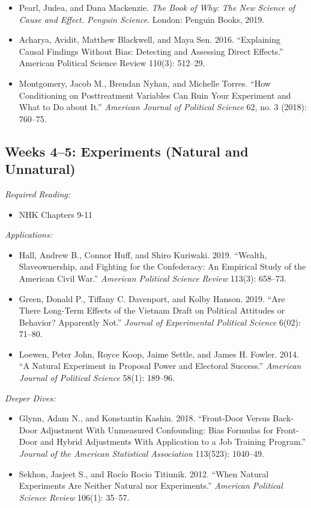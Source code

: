 \documentclass[11pt, letterpaper]{article}
\begin{document}
\begin{itemize}
	\item Pearl, Judea, and Dana Mackenzie. \textit{The Book of Why: The New Science of Cause and Effect. Penguin Science}. London: Penguin Books, 2019.
	\item Acharya, Avidit, Matthew Blackwell, and Maya Sen. 2016. ``Explaining Causal Findings Without Bias: Detecting and Assessing Direct Effects.'' American Political Science Review 110(3): 512–29.
	\item Montgomery, Jacob M., Brendan Nyhan, and Michelle Torres. ``How Conditioning on Posttreatment Variables Can Ruin Your Experiment and What to Do about It.'' \textit{American Journal of Political Science} 62, no. 3 (2018): 760–75.
\end{itemize}

\subsection*{Weeks 4--5: Experiments (Natural and Unnatural)}

\textit{Required Reading:}

\begin{itemize}
	\item NHK Chapters 9-11

\end{itemize}

\noindent \textit{Applications:}

\begin{itemize}
	\item Hall, Andrew B., Connor Huff, and Shiro Kuriwaki. 2019. ``Wealth, Slaveownership, and Fighting for the Confederacy: An Empirical Study of the American Civil War.'' \textit{American Political Science Review} 113(3): 658–73.
	\item Green, Donald P., Tiffany C. Davenport, and Kolby Hanson. 2019. ``Are There Long-Term Effects of the Vietnam Draft on Political Attitudes or Behavior? Apparently Not.'' \textit{Journal of Experimental Political Science} 6(02): 71–80.
	\item Loewen, Peter John, Royce Koop, Jaime Settle, and James H. Fowler. 2014. “A Natural Experiment in Proposal Power and Electoral Success.” \textit{American Journal of Political Science} 58(1): 189–96.
\end{itemize}

\noindent \textit{Deeper Dives:}

\begin{itemize}
	\item Glynn, Adam N., and Konstantin Kashin. 2018. ``Front-Door Versus Back-Door Adjustment With Unmeasured Confounding: Bias Formulas for Front-Door and Hybrid Adjustments With Application to a Job Training Program.'' \textit{Journal of the American Statistical Association} 113(523): 1040–49.
	\item Sekhon, Jasjeet S., and Rocío Rocio Titiunik. 2012. ``When Natural Experiments Are Neither Natural nor Experiments.'' \textit{American Political Science Review} 106(1): 35–57.
\end{itemize}
\end{document}
